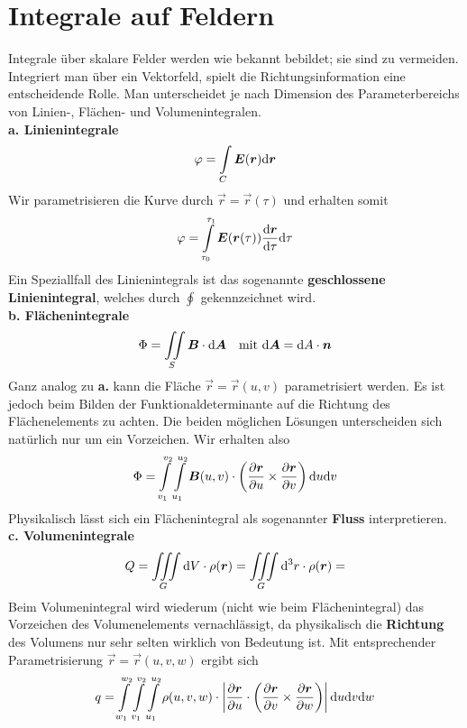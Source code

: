 \section{Integrale auf Feldern}
Integrale über skalare Felder werden wie bekannt bebildet; sie sind zu vermeiden.\\
Integriert man über ein Vektorfeld, spielt die Richtungsinformation eine entscheidende Rolle. Man unterscheidet je nach Dimension des Parameterbereichs von Linien-, Flächen- und Volumenintegralen.\\
\linebreak
\textbf{a. Linienintegrale}\\
\begin{equation*}
\varphi=\int\limits_{C}\bm{E}(\bm{r})\mathrm{d}\bm{r}
\end{equation*}
Wir parametrisieren die Kurve durch $\vec{r}=\vec{r}(\tau)$ und erhalten somit
\begin{equation*}
\varphi=\int\limits_{\tau_0}^{\tau_1}\bm{E}(\bm{r}(\tau))\frac{\mathrm{d}{\bm{r}}}{\mathrm{d}{\tau}}\mathrm{d} \tau
\end{equation*}
Ein Speziallfall des Linienintegrals ist das sogenannte \textbf{geschlossene Linienintegral}, welches durch $\oint$ gekennzeichnet wird.\\
\linebreak
\textbf{b. Flächenintegrale}\\
\begin{equation*}
\Phi=\iint\limits_{S}\bm{B}\cdot\mathrm{d} \bm{A} \ \ \ \text{mit } \mathrm{d}\bm{A}=\mathrm{d} A\cdot\bm{n}
\end{equation*}
Ganz analog zu \textbf{a.} kann die Fläche $\vec{r}=\vec{r}(u,v)$ parametrisiert werden. Es ist jedoch beim Bilden der Funktionaldeterminante auf die Richtung des Flächenelements zu achten. Die beiden möglichen Lösungen unterscheiden sich natürlich nur um ein Vorzeichen. Wir erhalten also
\begin{equation*}
\Phi=\int\limits_{v_1}^{v_2}\int\limits_{u_1}^{u_2}\bm{B}(u,v)\cdot\left(\frac{\partial{\bm{r}}}{\partial{u}}\times\frac{\partial{\bm{r}}}{\partial{v}}\right)\mathrm{d} u\mathrm{d} v
\end{equation*}
Physikalisch lässt sich ein Flächenintegral als sogenannter \textbf{Fluss} interpretieren.\\
\linebreak
\textbf{c. Volumenintegrale}\\
\linebreak
\begin{equation*}
Q=\iiint\limits_G\mathrm{d} V\cdot\rho(\bm{r})=\iiint\limits_G\mathrm{d} ^3 r\cdot\rho(\bm{r})=
\end{equation*}
Beim Volumenintegral wird wiederum (nicht wie beim Flächenintegral) das Vorzeichen des Volumenelements vernachlässigt, da physikalisch die \textbf{Richtung} des Volumens nur sehr selten wirklich von Bedeutung ist. Mit entsprechender Parametrisierung $\vec{r}=\vec{r}(u,v,w)$ ergibt sich
\begin{equation*}
q=\int\limits_{w_1}^{w_2}\int\limits_{v_1}^{v_2}\int\limits_{u_1}^{u_2}\rho(u,v,w)\cdot\left|\frac{\partial{\bm{r}}}{\partial{u}}\cdot\left(\frac{\partial{\bm{r}}}{\partial{v}}\times\frac{\partial{\bm{r}}}{\partial{w}}\right)\right|\mathrm{d} u\mathrm{d} v\mathrm{d} w
\end{equation*}

